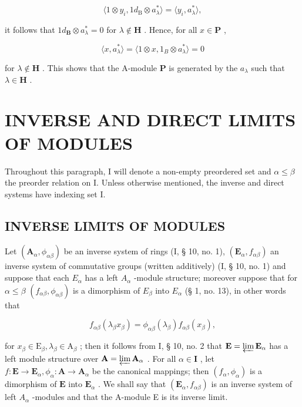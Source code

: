 \[
\langle 1 \otimes y _ {i}, 1 d _ {\mathrm{B}} \otimes a _ {\lambda} ^ {*} \rangle = \langle y _ {i}, a _ {\lambda} ^ {*} \rangle ,
\]

it follows that \(1d_{\mathbf{B}} \otimes a_{\lambda}^{*} = 0\) for \(\lambda \notin \mathbf{H}\) . Hence, for all \(x \in \mathbf{P}\) ,

\[
\langle x, a _ {\lambda} ^ {*} \rangle = \langle 1 \otimes x, 1 _ {B} \otimes a _ {\lambda} ^ {*} \rangle = 0
\]

for \(\lambda \notin \mathbf{H}\) . This shows that the A-module \(\mathbf{P}\) is generated by the \(a_{\lambda}\) such that \(\lambda \in \mathbf{H}\) .

\section{INVERSE AND DIRECT LIMITS OF MODULES}

Throughout this paragraph, I will denote a non-empty preordered set and \(\alpha \leqslant \beta\) the preorder relation on I. Unless otherwise mentioned, the inverse and direct systems have indexing set I.

\subsection{INVERSE LIMITS OF MODULES}

Let \((\mathbf{A}_{\alpha}, \phi_{\alpha\beta})\) be an inverse system of rings (I, § 10, no. 1), \((\mathbf{E}_{\alpha}, f_{\alpha\beta})\) an inverse system of commutative groups (written additively) (I, § 10, no. 1) and suppose that each \(E_{\alpha}\) has a left \(A_{\alpha}\) -module structure; moreover suppose that for \(\alpha \leqslant \beta\) \((f_{\alpha\beta}, \phi_{\alpha\beta})\) is a dimorphism of \(E_{\beta}\) into \(E_{\alpha}\) (§ 1, no. 13), in other words that

\[
f _ {\alpha \beta} (\lambda_ {\beta} x _ {\beta}) = \phi_ {\alpha \beta} (\lambda_ {\beta}) f _ {\alpha \beta} (x _ {\beta}),\tag{1}
\]

for \(x_{\beta} \in \mathrm{E}_{\beta}, \lambda_{\beta} \in \mathrm{A}_{\beta}\) ; then it follows from I, § 10, no. 2 that \(\mathbf{E} = \varprojlim \mathbf{E}_{\alpha}\) has a left module structure over \(\mathbf{A} = \varprojlim \mathbf{A}_{\alpha}\) . For all \(\alpha \in \mathbf{I}\) , let \(f: \mathbf{E} \to \mathbf{E}_{\alpha}, \phi_{\alpha}: \mathbf{A} \to \mathbf{A}_{\alpha}\) be the canonical mappings; then \((f_{\alpha}, \phi_{\alpha})\) is a dimorphism of \(\mathbf{E}\) into \(\mathbf{E}_{\alpha}\) . We shall say that \((\mathbf{E}_{\alpha}, f_{\alpha\beta})\) is an inverse system of left \(A_{\alpha}\) -modules and that the A-module E is its inverse limit.

